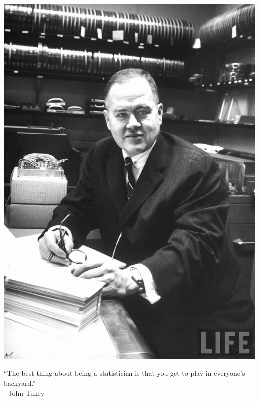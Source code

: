 \documentclass[xetex,mathserif,serif,aspectratio=169]{beamer}
\begin{document}
\begin{frame}[fragile] \frametitle{}

\noindent
\begin{minipage}{0.5\textwidth}
\includegraphics[width=0.9\linewidth]{img/tukey.jpg}
\end{minipage}%
\begin{minipage}{0.5\textwidth}
``The best thing about being a statistician is that
you get to play in everyone's backyard.'' \\

\hfill - John Tukey
\end{minipage}

\end{frame}
\end{document}
